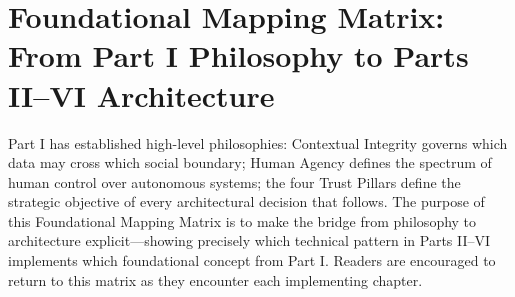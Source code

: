 \section{Foundational Mapping Matrix: From Part I Philosophy to Parts II--VI Architecture}
\label{sec:mapping_matrix}

Part I has established high-level philosophies: Contextual Integrity governs which data may cross which social boundary; Human Agency defines the spectrum of human control over autonomous systems; the four Trust Pillars define the strategic objective of every architectural decision that follows. The purpose of this Foundational Mapping Matrix is to make the bridge from philosophy to architecture explicit---showing precisely which technical pattern in Parts II--VI implements which foundational concept from Part I. Readers are encouraged to return to this matrix as they encounter each implementing chapter.

